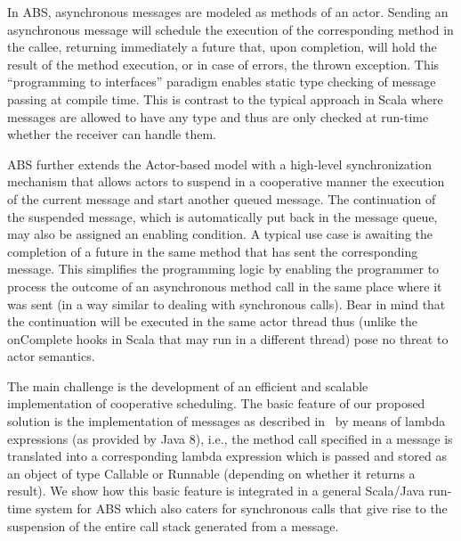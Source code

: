 \par In ABS, asynchronous messages are modeled as methods of an actor.
Sending an asynchronous message will schedule the execution of the corresponding method in the callee, returning immediately a future that, upon completion, will hold the result of the method execution, or in case of errors, the thrown exception.
This ``programming to interfaces'' paradigm enables static type checking of message passing at compile time.
This is contrast to the typical approach in Scala where messages are allowed to have any type and thus are only checked at run-time whether the receiver can handle them.

ABS further extends the Actor-based model with a high-level synchronization mechanism that allows actors to suspend in a cooperative manner the execution of the current message and start another queued message. 
The continuation of the suspended message, which is automatically put back in the message queue, may also be assigned an enabling condition. 
A typical use case is awaiting the completion of a future in the same method that has sent the corresponding message.
This simplifies the programming logic by enabling the programmer to process the outcome of an asynchronous method call in the same place where it was sent (in a way similar to dealing with synchronous calls).
Bear in mind that the continuation will be executed in the same actor thread thus (unlike the {\ttfamily onComplete} hooks in Scala that may run in a different thread) pose no threat to actor semantics.

The main challenge is the development of an efficient and scalable implementation of cooperative scheduling. 
The basic feature of our proposed solution is the implementation of messages as described in~\cite{paj8} by means of lambda expressions (as provided by Java 8), i.e., the method call specified in a message
is translated into a corresponding lambda expression which is passed and stored as
an object of type Callable or Runnable (depending on whether it returns a result). We show how this basic feature is integrated in a general Scala/Java run-time system for ABS which also caters for synchronous calls that give rise to the suspension of the entire call stack generated from a message.


